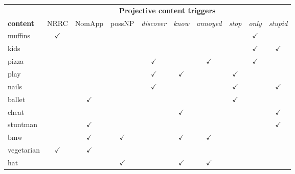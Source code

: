 \documentclass[11pt,fleqn]{article}
\newcommand{\6}{\mbox{$[\hspace*{-.6mm}[$}}
\newcommand{\9}{\mbox{$]\hspace*{-.6mm}]$}}
\begin{document}
\begin{table}[!h]
\begin{center}
\begin{tabular}{l|ccccccccc}
 & \multicolumn{9}{c}{\bf Projective content triggers} \\ 
 
{\bf content} & NRRC & NomApp & possNP & {\em discover} & {\em know} & {\em annoyed} & {\em stop} & {\em only} & {\em stupid} \\\hline \hline

muffins & $\checkmark$ & & & & & & & $\checkmark$ &  \\

\hline

kids & & & & & & & & $\checkmark$ & $\checkmark$ \\

\hline

pizza & & & & $\checkmark$ & & $\checkmark$ & & $\checkmark$ &  \\

\hline

play & & & & $\checkmark$ & $\checkmark$ & & $\checkmark$ & &  \\

\hline

nails & & & & $\checkmark$ & & & $\checkmark$ & & $\checkmark$  \\

\hline

ballet & & $\checkmark$& & & & & $\checkmark$ & &  \\

\hline

cheat & & & & & $\checkmark$ & & & & $\checkmark$ \\

\hline

stuntman & & $\checkmark$ & & & & & & & $\checkmark$ \\

\hline

bmw & & $\checkmark$ & $\checkmark$ & & $\checkmark$ & $\checkmark$ & & &  \\

\hline

vegetarian & $\checkmark$ & $\checkmark$& & & & & & &  \\

\hline

hat & & & $\checkmark$ & & $\checkmark$ & $\checkmark$ & & &  \\

\hline


\end{tabular}
\end{center}
\end{table}
\end{document}
